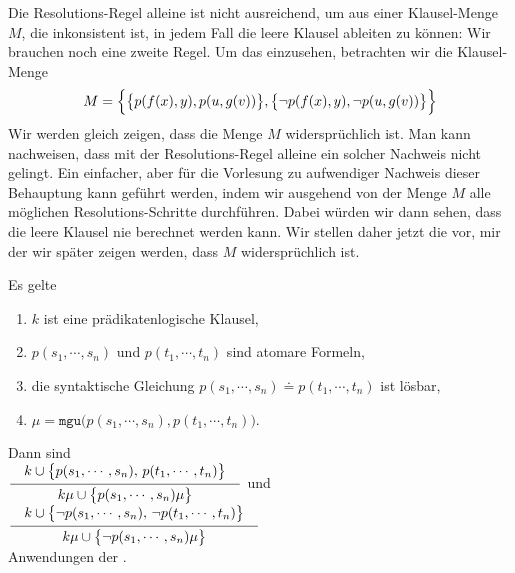 \noindent
Die Resolutions-Regel alleine ist nicht ausreichend, um aus einer Klausel-Menge $M$, die
inkonsistent ist, in 
jedem Fall die leere Klausel ableiten zu können: Wir brauchen noch eine zweite Regel.
Um das einzusehen, betrachten wir die Klausel-Menge 
\[ M = \Bigl\{ \bigl\{p(f(x),y), p(u,g(v))\bigr\}, 
               \bigl\{\neg p(f(x),y), \neg p(u,g(v))\bigr\} \Bigr\} 
\]
Wir werden gleich zeigen, dass die Menge $M$ widersprüchlich ist.  Man kann nachweisen,
dass mit der Resolutions-Regel alleine ein solcher Nachweis nicht gelingt.
Ein einfacher, aber für die Vorlesung zu aufwendiger Nachweis dieser Behauptung kann
geführt werden, indem wir ausgehend von der Menge $M$ alle möglichen Resolutions-Schritte
durchführen.  Dabei würden wir dann sehen, dass die leere Klausel nie berechnet werden kann.
Wir stellen daher jetzt die
 vor, mir der wir später zeigen werden, dass $M$ widersprüchlich
ist.


\begin{Definition} Es gelte 
  \begin{enumerate}
  \item $k$ ist  eine prädikatenlogische Klausel,
  \item $p(s_1,\cdots,s_n)$ und $p(t_1,\cdots,t_n)$ sind atomare Formeln,
  \item die syntaktische Gleichung $p(s_1,\cdots,s_n)  \doteq p(t_1,\cdots,t_n)$ ist lösbar, 
  \item $\mu = \mathtt{mgu}\bigl(p(s_1,\cdots,s_n), p(t_1,\cdots,t_n)\bigr)$.
  \end{enumerate}
  Dann sind \\[0.3cm]
  \hspace*{0.8cm}
  $\schluss{k \cup \bigl\{p(s_1,\cdots,s_n),\, p(t_1,\cdots,t_n)\bigl\}}{k\mu \cup \bigl\{p(s_1,\cdots,s_n)\mu\bigr\} }$ 
  \quad und \quad
  $\schluss{k \cup \bigl\{ \neg p(s_1,\cdots,s_n),\, \neg p(t_1,\cdots,t_n)\bigl\}}{k\mu \cup \bigl\{\neg p(s_1,\cdots,s_n)\mu\bigr\} }$ 
  \\[0.3cm]
  Anwendungen der .
  \eox
\end{Definition}


